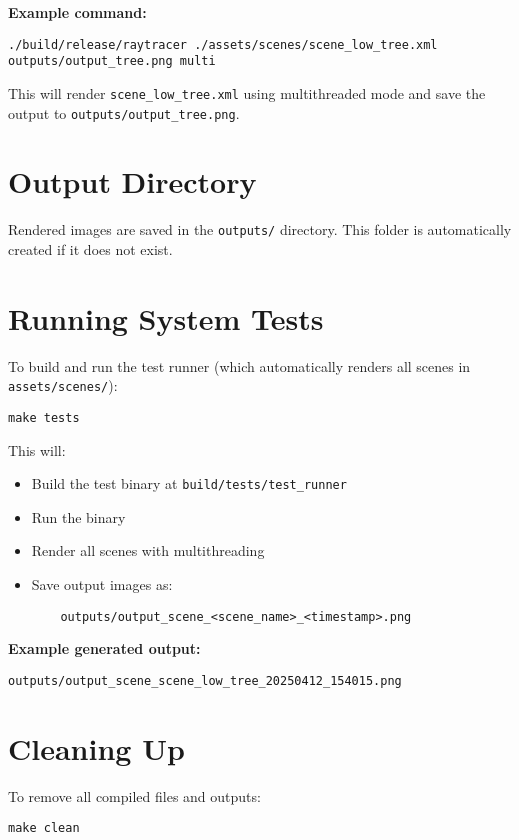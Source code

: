 \documentclass[11pt]{article}
\begin{document}
\textbf{Example command:}
\begin{lstlisting}
./build/release/raytracer ./assets/scenes/scene_low_tree.xml outputs/output_tree.png multi
\end{lstlisting}

This will render \texttt{scene\_low\_tree.xml} using multithreaded mode and save the output to \texttt{outputs/output\_tree.png}.

\section{Output Directory}
Rendered images are saved in the \texttt{outputs/} directory. This folder is automatically created if it does not exist.

\section{Running System Tests}
To build and run the test runner (which automatically renders all scenes in \texttt{assets/scenes/}):

\begin{lstlisting}
make tests
\end{lstlisting}

This will:
\begin{itemize}
    \item Build the test binary at \texttt{build/tests/test\_runner}
    \item Run the binary
    \item Render all scenes with multithreading
    \item Save output images as:
    \begin{lstlisting}
    outputs/output_scene_<scene_name>_<timestamp>.png
    \end{lstlisting}
\end{itemize}

\textbf{Example generated output:}
\begin{lstlisting}
outputs/output_scene_scene_low_tree_20250412_154015.png
\end{lstlisting}

\section{Cleaning Up}
To remove all compiled files and outputs:

\begin{lstlisting}
make clean
\end{lstlisting}
\end{document}
